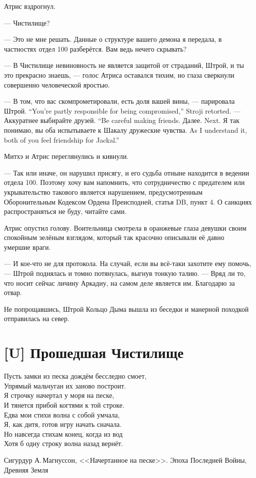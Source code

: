 Атрис вздрогнул.

--- Чистилище?

--- Это не мне решать.
Данные о структуре вашего демона я передала, в частностях отдел 100 разберётся.
Вам ведь нечего скрывать?

--- В Чистилище невиновность не является защитой от страданий, Штрой, и ты это прекрасно знаешь, --- голос Атриса оставался тихим, но глаза сверкнули совершенно человеческой яростью.

{--- В том, что вас скомпрометировали, есть доля вашей вины, --- парировала Штрой.}
{``You're partly responsible for being compromised,'' Stroji retorted.}
{--- Аккуратнее выбирайте друзей.}
{``Be careful making friends.}
{Далее.}
{Next.}
{Я так понимаю, вы оба испытываете к Шакалу дружеские чувства.}
{As I understand it, both of you feel friendship for Jackal.''}

Митхэ и Атрис переглянулись и кивнули.

--- Так или иначе, он нарушил присягу, и его судьба отныне находится в ведении отдела 100.
Поэтому хочу вам напомнить, что сотрудничество с предателем или укрывательство такового является нарушением, предусмотренным Оборонительным Кодексом Ордена Преисподней, статья DB, пункт 4.
О санкциях распространяться не буду, читайте сами.

Атрис опустил голову.
Воительница смотрела в оранжевые глаза девушки своим спокойным зелёным взглядом, который так красочно описывали её давно умершие враги.

--- И кое-что не для протокола.
На случай, если вы всё-таки захотите ему помочь, --- Штрой поднялась и томно потянулась, выгнув тонкую талию.
--- Вряд ли то, что носит сейчас личину Аркадиу, на самом деле является им.
Благодарю за отвар.

Не попрощавшись, Штрой Кольцо Дыма вышла из беседки и манерной походкой отправилась на север.

\section{[U] Прошедшая Чистилище}

\epigraph
{Пусть замки из песка дождём бесследно смоет,\\
Упрямый мальчуган их заново построит.\\
Я строчку начертал у моря на песке,\\
И тянется прибой когтями к той строке.\\
Едва мои стихи волна с собой умчала,\\
Я, как дитя, готов игру начать сначала.\\
Но навсегда стихам конец, когда из вод\\
Хотя б одну строку волна назад вернёт.}
{Сигурдур А.\,Магнуссон, <<Начертанное на песке>>.
Эпоха Последней Войны, Древняя Земля}

